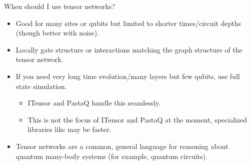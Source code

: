 \begin{frame}{When should I use tensor networks?}

\begin{itemize}[<+->]

  \item Good for many sites or qubits but limited to shorter times/circuit depths (though better with noise).
  \item Locally gate structure or interactions matching the graph structure of the tensor network.
  \item If you need very long time evolution/many layers but few qubits, use full state simulation.
    
  \begin{itemize}[<+->]

    \item ITensor and PastaQ handle this seamlessly.
    \item This is not the focus of ITensor and PastaQ at the moment, specialized libraries like  may be faster.

  \end{itemize}

  \item Tensor networks are a common, general language for reasoning about quantum many-body systems (for example, quantum circuits).

\end{itemize}

\end{frame}
